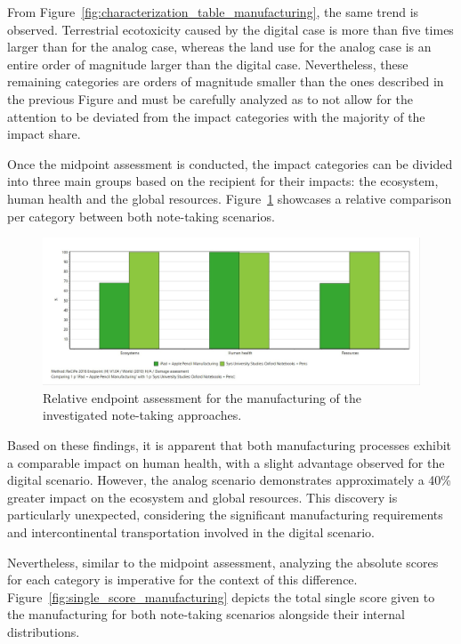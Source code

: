 From Figure~\ref{fig:characterization_table_manufacturing}, the same trend is observed. Terrestrial ecotoxicity caused by the digital case is more than five times larger than for the analog case, whereas the land use for the analog case is an entire order of magnitude larger than the digital case. Nevertheless, these remaining categories are orders of magnitude smaller than the ones described in the previous Figure and must be carefully analyzed as to not allow for the attention to be deviated from the impact categories with the majority of the impact share. 

Once the midpoint assessment is conducted, the impact categories can be divided into three main groups based on the recipient for their impacts: the ecosystem, human health and the global resources. Figure~\ref{fig:damage_assessment_manufacturing} showcases a relative comparison per category between both note-taking scenarios.

\begin{figure}[H]
    \centering
    \includegraphics[width=\textwidth]{images/Manufacturing/Damage_Assessment_Manufacturing.JPG}
    \caption{Relative endpoint assessment for the manufacturing of the investigated note-taking approaches.}\label{fig:damage_assessment_manufacturing}
\end{figure}

Based on these findings, it is apparent that both manufacturing processes exhibit a comparable impact on human health, with a slight advantage observed for the digital scenario. However, the analog scenario demonstrates approximately a 40\% greater impact on the ecosystem and global resources. This discovery is particularly unexpected, considering the significant manufacturing requirements and intercontinental transportation involved in the digital scenario.

Nevertheless, similar to the midpoint assessment, analyzing the absolute scores for each category is imperative for the context of this difference. Figure~\ref{fig:single_score_manufacturing} depicts the total single score given to the manufacturing for both note-taking scenarios alongside their internal distributions. 

